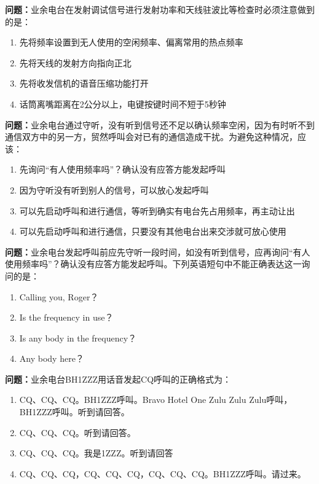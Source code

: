\documentclass[UTF8]{ctexbook}
\begin{document}
\textbf{问题：}业余电台在发射调试信号进行发射功率和天线驻波比等检查时必须注意做到的是：
\begin{enumerate}[label=\Alph*), leftmargin=3em]
  \item 先将频率设置到无人使用的空闲频率、偏离常用的热点频率
  \item 先将天线的发射方向指向正北
  \item 先将收发信机的语音压缩功能打开
  \item 话筒离嘴距离在2公分以上，电键按键时间不短于5秒钟
\end{enumerate}

\textbf{问题：}业余电台通过守听，没有听到信号还不足以确认频率空闲，因为有时听不到通信双方中的另一方，贸然呼叫会对已有的通信造成干扰。为避免这种情况，应该：
\begin{enumerate}[label=\Alph*), leftmargin=3em]
  \item 先询问“有人使用频率吗”？确认没有应答方能发起呼叫
  \item 因为守听没有听到别人的信号，可以放心发起呼叫
  \item 可以先启动呼叫和进行通信，等听到确实有电台先占用频率，再主动让出
  \item 可以先启动呼叫和进行通信，只要没有其他电台出来交涉就可放心使用
\end{enumerate}

\textbf{问题：}业余电台发起呼叫前应先守听一段时间，如没有听到信号，应再询问“有人使用频率吗”？确认没有应答方能发起呼叫。下列英语短句中不能正确表达这一询问的是：
\begin{enumerate}[label=\Alph*), leftmargin=3em]
  \item Calling you, Roger？
  \item Is the frequency in use？
  \item Is any body in the frequency？
  \item Any body here？
\end{enumerate}

\textbf{问题：}业余电台BH1ZZZ用话音发起CQ呼叫的正确格式为：
\begin{enumerate}[label=\Alph*), leftmargin=3em]
  \item CQ、CQ、CQ。BH1ZZZ呼叫。Bravo Hotel One Zulu Zulu Zulu呼叫，BH1ZZZ呼叫。听到请回答。
  \item CQ、CQ、CQ。听到请回答。
  \item CQ、CQ、CQ。我是1ZZZ。听到请回答
  \item CQ、CQ、CQ，CQ、CQ、CQ，CQ、CQ、CQ。BH1ZZZ呼叫。请过来。
\end{enumerate}
\end{document}

